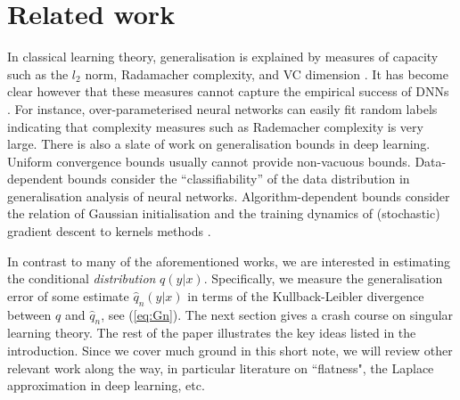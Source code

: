 \documentclass{article} %
\begin{document}
\section{Related work}
In classical learning theory, generalisation is explained by measures of capacity such as the $l_2$ norm, Radamacher complexity, and VC dimension \citep{bousquet2003introduction}. It has become clear however that these measures cannot capture the empirical success of DNNs \citep{zhang_understanding_2017}. 
For instance, over-parameterised neural networks can easily fit random labels \citep{zhang_understanding_2017,du2018gradient,allen2019convergence} indicating that complexity measures such as Rademacher complexity is very large.
There is also a slate of work on generalisation bounds in deep learning. Uniform convergence bounds \citep{neyshabur2015norm,bartlett2017spectrally,neyshabur2018towards,neyshabur2019towards,arora2018stronger} usually cannot provide non-vacuous bounds.
Data-dependent bounds \citep{brutzkus2018sgd,li2018learning,allen2019learning} consider the ``classifiability'' of the data distribution in generalisation analysis of neural networks.
Algorithm-dependent bounds \citep{daniely2017sgd,arora2019fine,yehudai2019power,cao2019generalization} consider the relation of Gaussian initialisation and the training dynamics of (stochastic) gradient descent to kernels methods \citep{jacot2018neural}.

In contrast to many of the aforementioned works, we are interested in estimating the conditional \textit{distribution} $q(y|x)$. Specifically, we measure the generalisation error of some estimate $\hat q_n(y|x)$ in terms of the Kullback-Leibler divergence between $q$ and $\hat q_n$, see (\ref{eq:Gn}). The next section gives a crash course on singular learning theory. The rest of the paper illustrates the key ideas listed in the introduction. Since we cover much ground in this short note, we will review other relevant work along the way, in particular literature on ``flatness", the Laplace approximation in deep learning, etc. 
\end{document}
